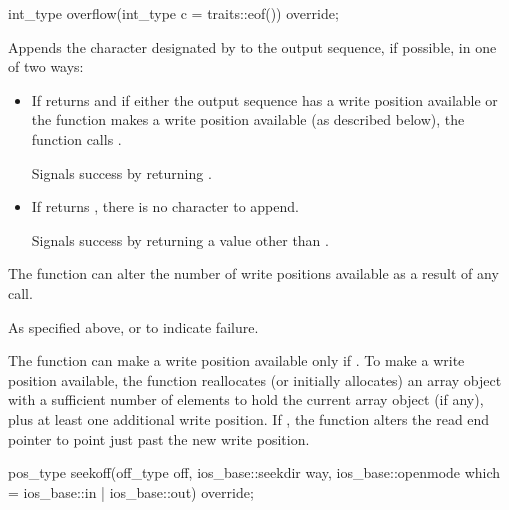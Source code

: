 %
\begin{itemdecl}
int_type overflow(int_type c = traits::eof()) override;
\end{itemdecl}

\begin{itemdescr}
\pnum
\effects
Appends the character designated by  to the output
sequence, if possible, in one of two ways:
\begin{itemize}
\item
If
returns
and if either
the output sequence has a write position available or
the function makes a write position available
(as described below),
the function calls
.

Signals success by returning .

\item
If
returns
,
there is no character to append.

Signals success by returning a value other than
.
\end{itemize}

\pnum
\remarks
The function can alter the number of write positions available as a
result of any call.

\pnum
\returns
As specified above, or
to indicate failure.

\pnum
The function can make a write position available only if
.
To make a write position available,
the function reallocates (or initially allocates) an array object
with a sufficient number of elements to hold
the current array object (if any), plus
at least
one additional write position.
If
,
the function alters the read end pointer
to point just past the new write position.
\end{itemdescr}

%
\begin{itemdecl}
pos_type seekoff(off_type off, ios_base::seekdir way,
                 ios_base::openmode which
                   = ios_base::in | ios_base::out) override;
\end{itemdecl}

